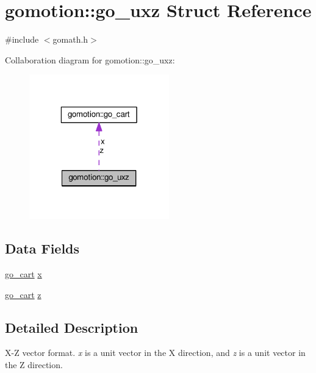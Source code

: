 \hypertarget{structgomotion_1_1go__uxz}{\section{gomotion\-:\-:go\-\_\-uxz Struct Reference}
\label{structgomotion_1_1go__uxz}
}


{\ttfamily \#include $<$gomath.\-h$>$}



Collaboration diagram for gomotion\-:\-:go\-\_\-uxz\-:\nopagebreak
\begin{figure}[H]
\begin{center}
\leavevmode
\includegraphics[width=172pt]{d8/de6/structgomotion_1_1go__uxz__coll__graph}
\end{center}
\end{figure}
\subsection*{Data Fields}
\begin{DoxyCompactItemize}
\item 
\hyperlink{structgomotion_1_1go__cart}{go\-\_\-cart} \hyperlink{structgomotion_1_1go__uxz_a1878a66236a43365991c4e4db1e5e518}{x}
\item 
\hyperlink{structgomotion_1_1go__cart}{go\-\_\-cart} \hyperlink{structgomotion_1_1go__uxz_a4c7bd45717e596a7a9331417d9bcfe83}{z}
\end{DoxyCompactItemize}


\subsection{Detailed Description}
X-\/\-Z vector format. {\itshape x} is a unit vector in the X direction, and {\itshape z} is a unit vector in the Z direction. 

